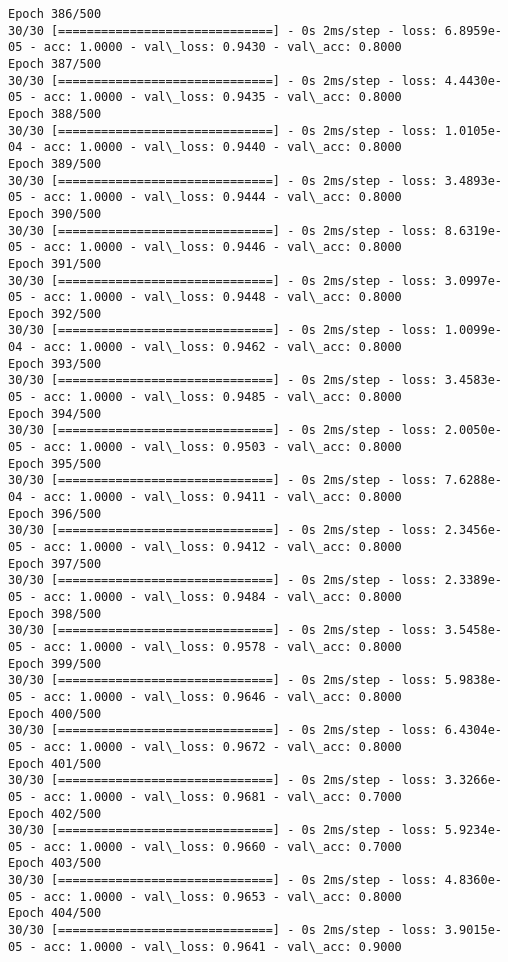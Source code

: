\documentclass[11pt]{article}
\begin{document}
\begin{Verbatim}[commandchars=\\\{\}]
Epoch 386/500
30/30 [==============================] - 0s 2ms/step - loss: 6.8959e-05 - acc: 1.0000 - val\_loss: 0.9430 - val\_acc: 0.8000
Epoch 387/500
30/30 [==============================] - 0s 2ms/step - loss: 4.4430e-05 - acc: 1.0000 - val\_loss: 0.9435 - val\_acc: 0.8000
Epoch 388/500
30/30 [==============================] - 0s 2ms/step - loss: 1.0105e-04 - acc: 1.0000 - val\_loss: 0.9440 - val\_acc: 0.8000
Epoch 389/500
30/30 [==============================] - 0s 2ms/step - loss: 3.4893e-05 - acc: 1.0000 - val\_loss: 0.9444 - val\_acc: 0.8000
Epoch 390/500
30/30 [==============================] - 0s 2ms/step - loss: 8.6319e-05 - acc: 1.0000 - val\_loss: 0.9446 - val\_acc: 0.8000
Epoch 391/500
30/30 [==============================] - 0s 2ms/step - loss: 3.0997e-05 - acc: 1.0000 - val\_loss: 0.9448 - val\_acc: 0.8000
Epoch 392/500
30/30 [==============================] - 0s 2ms/step - loss: 1.0099e-04 - acc: 1.0000 - val\_loss: 0.9462 - val\_acc: 0.8000
Epoch 393/500
30/30 [==============================] - 0s 2ms/step - loss: 3.4583e-05 - acc: 1.0000 - val\_loss: 0.9485 - val\_acc: 0.8000
Epoch 394/500
30/30 [==============================] - 0s 2ms/step - loss: 2.0050e-05 - acc: 1.0000 - val\_loss: 0.9503 - val\_acc: 0.8000
Epoch 395/500
30/30 [==============================] - 0s 2ms/step - loss: 7.6288e-04 - acc: 1.0000 - val\_loss: 0.9411 - val\_acc: 0.8000
Epoch 396/500
30/30 [==============================] - 0s 2ms/step - loss: 2.3456e-05 - acc: 1.0000 - val\_loss: 0.9412 - val\_acc: 0.8000
Epoch 397/500
30/30 [==============================] - 0s 2ms/step - loss: 2.3389e-05 - acc: 1.0000 - val\_loss: 0.9484 - val\_acc: 0.8000
Epoch 398/500
30/30 [==============================] - 0s 2ms/step - loss: 3.5458e-05 - acc: 1.0000 - val\_loss: 0.9578 - val\_acc: 0.8000
Epoch 399/500
30/30 [==============================] - 0s 2ms/step - loss: 5.9838e-05 - acc: 1.0000 - val\_loss: 0.9646 - val\_acc: 0.8000
Epoch 400/500
30/30 [==============================] - 0s 2ms/step - loss: 6.4304e-05 - acc: 1.0000 - val\_loss: 0.9672 - val\_acc: 0.8000
Epoch 401/500
30/30 [==============================] - 0s 2ms/step - loss: 3.3266e-05 - acc: 1.0000 - val\_loss: 0.9681 - val\_acc: 0.7000
Epoch 402/500
30/30 [==============================] - 0s 2ms/step - loss: 5.9234e-05 - acc: 1.0000 - val\_loss: 0.9660 - val\_acc: 0.7000
Epoch 403/500
30/30 [==============================] - 0s 2ms/step - loss: 4.8360e-05 - acc: 1.0000 - val\_loss: 0.9653 - val\_acc: 0.8000
Epoch 404/500
30/30 [==============================] - 0s 2ms/step - loss: 3.9015e-05 - acc: 1.0000 - val\_loss: 0.9641 - val\_acc: 0.9000

\end{Verbatim}
\end{document}
